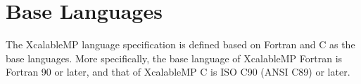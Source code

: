 \section{Base Languages}

The XcalableMP language specification is defined based on Fortran
and C as the base languages. More specifically, the base language of XcalableMP 
Fortran is Fortran 90 or later, and that of XcalableMP C is ISO C90
(ANSI C89) or later.

%
%
%
%
%
%
